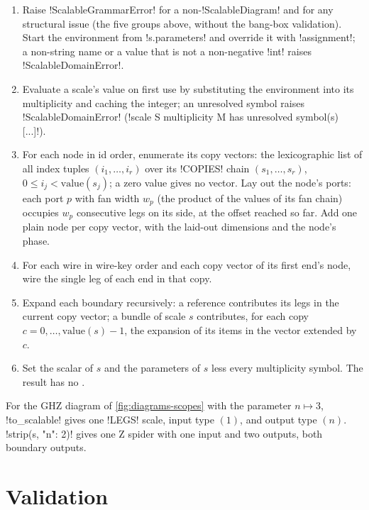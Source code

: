 \begin{algorithm}[Strip]\label{alg:diagrams-strip}
\begin{enumerate}
\item Raise \py!ScalableGrammarError! for a non-\py!ScalableDiagram! and for any structural issue (the five groups above, without the bang-box validation). Start the environment from \py!s.parameters! and override it with \py!assignment!; a non-string name or a value that is not a non-negative \py!int! raises \py!ScalableDomainError!.
\item Evaluate a scale's value on first use by substituting the environment into its multiplicity and caching the integer; an unresolved symbol raises \py!ScalableDomainError! (\code!scale S multiplicity M has unresolved symbol(s) [...]!).
\item For each node in id order, enumerate its copy vectors: the lexicographic list of all index tuples $(i_1,\dots,i_r)$ over its \code!COPIES! chain $(s_1,\dots,s_r)$, $0\le i_j<\mathrm{value}(s_j)$; a zero value gives no vector. Lay out the node's ports: each port $p$ with fan width $w_p$ (the product of the values of its fan chain) occupies $w_p$ consecutive legs on its side, at the offset reached so far. Add one plain node per copy vector, with the laid-out dimensions and the node's phase.
\item For each wire in wire-key order and each copy vector of its first end's node, wire the single leg of each end in that copy.
\item Expand each boundary recursively: a reference contributes its legs in the current copy vector; a bundle of scale $s$ contributes, for each copy $c=0,\dots,\mathrm{value}(s)-1$, the expansion of its items in the vector extended by $c$.
\item Set the scalar of $s$ and the parameters of $s$ less every multiplicity symbol. The result has no \bboxes{}.
\end{enumerate}
\end{algorithm}

\begin{example}
For the GHZ diagram of \cref{fig:diagrams-scopes} with the parameter $n\mapsto 3$, \py!to_scalable! gives one \code!LEGS! scale, input type $(1)$, and output type $(n)$. \py!strip(s, {"n": 2})! gives one Z spider with one input and two outputs, both boundary outputs.
\end{example}

\section{Validation}\label{sec:diagrams-validate}
\bgroup\sloppy

